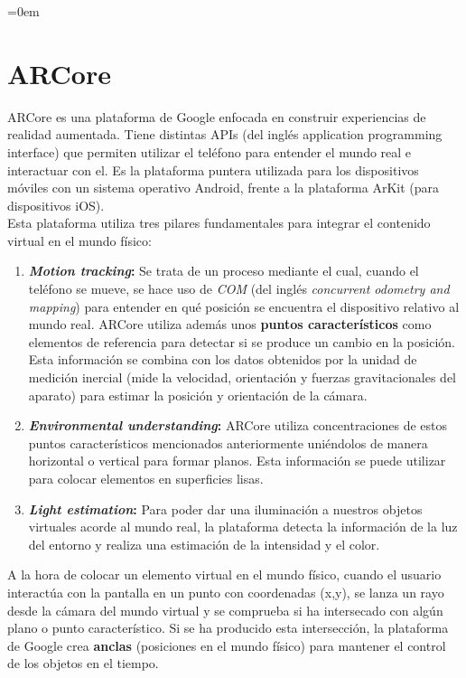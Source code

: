 \parindent=0em
\section{ARCore}
\noindent

ARCore es una plataforma de Google \cite{ARCoreOverview} enfocada en construir experiencias de realidad aumentada. Tiene distintas APIs (del inglés application programming interface) que permiten utilizar el teléfono para entender el mundo real e interactuar con el. Es la plataforma puntera utilizada para los dispositivos móviles con un sistema operativo Android, frente a la plataforma ArKit (para dispositivos iOS).\\

Esta plataforma utiliza tres pilares fundamentales para integrar el contenido virtual en el mundo físico:

\begin{enumerate}[label=\arabic*)]
    \item \textbf{\textit{Motion tracking}:} Se trata de un proceso mediante el cual, cuando el teléfono se mueve, se hace uso de \textit{COM} (del inglés \textit{concurrent odometry and mapping}) para entender en qué posición se encuentra el dispositivo relativo al mundo real. ARCore utiliza además unos \textbf{puntos característicos} como elementos de referencia para detectar si se produce un cambio en la posición. Esta información se combina con los datos obtenidos por la unidad de medición inercial (mide la velocidad, orientación y fuerzas gravitacionales del aparato) para estimar la posición y orientación de la cámara.
    
     \item \textbf{\textit{Environmental understanding}:} ARCore utiliza concentraciones de estos puntos característicos mencionados anteriormente uniéndolos de manera horizontal o vertical para formar planos. Esta información se puede utilizar para colocar elementos en superficies lisas.
     
     \item \textbf{\textit{Light estimation}:} Para poder dar una iluminación a nuestros objetos virtuales acorde al mundo real, la plataforma detecta la información de la luz del entorno y realiza una estimación de la intensidad y el color.
\end{enumerate}

A la hora de colocar un elemento virtual en el mundo físico, cuando el usuario interactúa con la pantalla en un punto con coordenadas (x,y), se lanza un rayo desde la cámara del mundo virtual y se comprueba si ha intersecado con algún plano o punto característico. Si se ha producido esta intersección, la plataforma de Google crea \textbf{anclas} (posiciones en el mundo físico) para mantener el control de los objetos en el tiempo.\\

